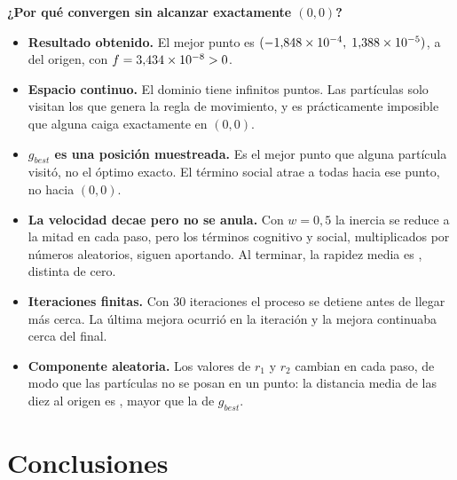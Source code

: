 \documentclass[12pt,a4paper]{article}
\begin{document}
\textbf{¿Por qué convergen sin alcanzar exactamente $(0,0)$?}
\begin{itemize}
  \item \textbf{Resultado obtenido.} El mejor punto es
  $(-1{,}848\times10^{-4},\;1{,}388\times10^{-5})$, a \PcincoDist{} del origen, con
  $f=3{,}434\times10^{-8}>0$.
  \item \textbf{Espacio continuo.} El dominio tiene infinitos puntos. Las
  partículas solo visitan los que genera la regla de movimiento, y es
  prácticamente imposible que alguna caiga exactamente en $(0,0)$.
  \item \textbf{$g_{best}$ es una posición muestreada.} Es el mejor punto
  que alguna partícula visitó, no el óptimo exacto. El término social atrae a
  todas hacia ese punto, no hacia $(0,0)$.
  \item \textbf{La velocidad decae pero no se anula.} Con $w=0{,}5$ la
  inercia se reduce a la mitad en cada paso, pero los términos cognitivo y
  social, multiplicados por números aleatorios, siguen aportando. Al
  terminar, la rapidez media es \PcincoRapidez{}, distinta de cero.
  \item \textbf{Iteraciones finitas.} Con 30 iteraciones el proceso se
  detiene antes de llegar más cerca. La última mejora ocurrió en la
  iteración \PcincoUltimaMejora{} y la mejora continuaba cerca del final.
  \item \textbf{Componente aleatoria.} Los valores de $r_1$ y $r_2$ cambian
  en cada paso, de modo que las partículas no se posan en un punto: la
  distancia media de las diez al origen es \PcincoDistMedia{}, mayor que la
  de $g_{best}$.
\end{itemize}

\section{Conclusiones}
\end{document}
